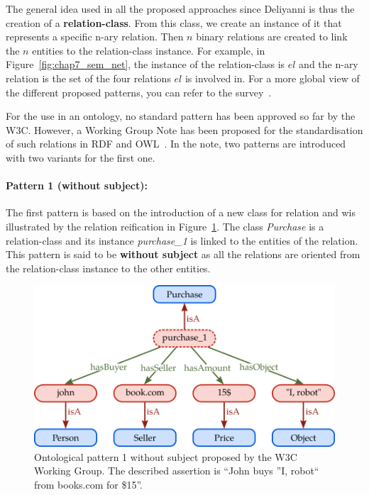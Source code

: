 The general idea used in all the proposed approaches since Deliyanni is thus the creation of a \textbf{relation-class}. From this class, we create an instance of it that represents a specific n-ary relation. Then $n$ binary relations are created to link the $n$ entities to the relation-class instance. For example, in Figure~\ref{fig:chap7_sem_net}, the instance of the relation-class is $el$ and the n-ary relation is the set of the four relations $el$ is involved in. For a more global view of the different proposed patterns, you can refer to the survey~\cite{gangemi_2013_multi}.

For the use in an ontology, no standard pattern has been approved so far by the W3C. However, a Working Group Note has been proposed for the standardisation of such relations in RDF and OWL~\cite{w3c_2006_defining}. In the note, two patterns are introduced with two variants for the first one.

\paragraph{Pattern 1 (without subject):} The first pattern is based on the introduction of a new class for relation and wis illustrated by the relation reification in Figure~\ref{fig:chap7_w3c_p2}. The class \textit{Purchase} is a relation-class and its instance \textit{purchase\_1} is linked to the entities of the relation. This pattern is said to be \textbf{without subject} as all the relations are oriented from the relation-class instance to the other entities.

\begin{figure}[ht!]
\centering
\includegraphics[scale=0.45]{figures/chapter7/w3c_p2.png}
\caption{\label{fig:chap7_w3c_p2} Ontological pattern 1 without subject proposed by the W3C Working Group. The described assertion is ``John buys ''I, robot`` from books.com for \$15''.}
\end{figure}

